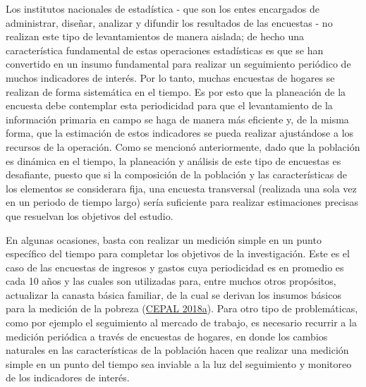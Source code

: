 \documentclass[
  12pt,
  spanish,
]{book}
\begin{document}
Los institutos nacionales de estadística - que son los entes encargados de administrar, diseñar, analizar y difundir los resultados de las encuestas - no realizan este tipo de levantamientos de manera aislada; de hecho una característica fundamental de estas operaciones estadísticas es que se han convertido en un insumo fundamental para realizar un seguimiento periódico de muchos indicadores de interés. Por lo tanto, muchas encuestas de hogares se realizan de forma sistemática en el tiempo. Es por esto que la planeación de la encuesta debe contemplar esta periodicidad para que el levantamiento de la información primaria en campo se haga de manera más eficiente y, de la misma forma, que la estimación de estos indicadores se pueda realizar ajustándose a los recursos de la operación. Como se mencionó anteriormente, dado que la población es dinámica en el tiempo, la planeación y análisis de este tipo de encuestas es desafiante, puesto que si la composición de la población y las características de los elementos se considerara fija, una encuesta transversal (realizada una sola vez en un periodo de tiempo largo) sería suficiente para realizar estimaciones precisas que resuelvan los objetivos del estudio.

En algunas ocasiones, basta con realizar un medición simple en un punto específico del tiempo para completar los objetivos de la investigación. Este es el caso de las encuestas de ingresos y gastos cuya periodicidad es en promedio es cada 10 años y las cuales son utilizadas para, entre muchos otros propósitos, actualizar la canasta básica familiar, de la cual se derivan los insumos básicos para la medición de la pobreza (\protect\hyperlink{ref-CEPAL_2018}{CEPAL 2018a}). Para otro tipo de problemáticas, como por ejemplo el seguimiento al mercado de trabajo, es necesario recurrir a la medición periódica a través de encuestas de hogares, en donde los cambios naturales en las características de la población hacen que realizar una medición simple en un punto del tiempo sea inviable a la luz del seguimiento y monitoreo de los indicadores de interés.
\end{document}
